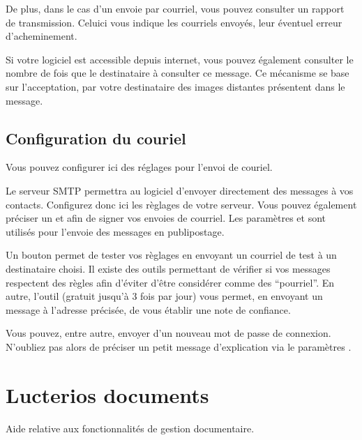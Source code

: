 \documentclass[letterpaper,10pt,french]{sphinxmanual}
\begin{document}
De plus, dans le cas d’un envoie par courriel, vous pouvez consulter un rapport de transmission.
Celui\sphinxhyphen{}ci vous indique les courriels envoyés, leur éventuel erreur d’acheminement.

Si votre logiciel est accessible depuis internet, vous pouvez également consulter le nombre de fois que le destinataire à consulter ce message.
Ce mécanisme se base sur l’acceptation, par votre destinataire des images distantes présentent dans le message.

\noindent{}


\section{Configuration du couriel}
\label{\detokenize{mailing/configuration:configuration-du-couriel}}\label{\detokenize{mailing/configuration::doc}}
Vous pouvez configurer ici des réglages pour l’envoi de couriel.

Le serveur SMTP permettra au logiciel d’envoyer directement des messages à vos contacts.
Configurez donc ici les règlages de votre serveur.
Vous pouvez également préciser un  et  afin de signer vos envoies de courriel.
Les paramètres  et  sont utilisés pour l’envoie des messages en publipostage.

Un bouton  permet de tester vos règlages en envoyant un courriel de test à un destinataire choisi.
Il existe des outils permettant de vérifier si vos messages respectent des règles afin d’éviter d’être considérer comme des “pourriel”.
En autre, l’outil  (gratuit jusqu’à 3 fois par jour) vous permet, en envoyant un message à l’adresse précisée, de vous établir une note de confiance.

Vous pouvez, entre autre, envoyer d’un nouveau mot de passe de connexion.
N’oubliez pas alors de préciser un petit message d’explication via le paramètres .


\chapter{Lucterios documents}
\label{\detokenize{documents/index:lucterios-documents}}\label{\detokenize{documents/index::doc}}
Aide relative aux fonctionnalités de gestion documentaire.
\end{document}
